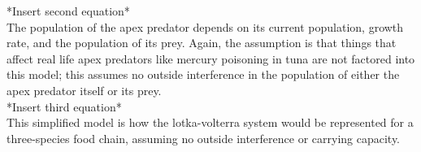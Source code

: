 \documentclass[11pt,oneside]{article}
\begin{document}
*Insert second equation*\\

The population of the apex predator depends on its current population, growth rate, and the population of its prey. Again, the assumption is that things that affect real life apex predators like mercury poisoning in tuna are not factored into this model; this assumes no outside interference in the population of either the apex predator itself or its prey.\\

*Insert third equation*\\

This simplified model is how the lotka-volterra system would be represented for a three-species food chain, assuming no outside interference or carrying capacity.
\end{document}
